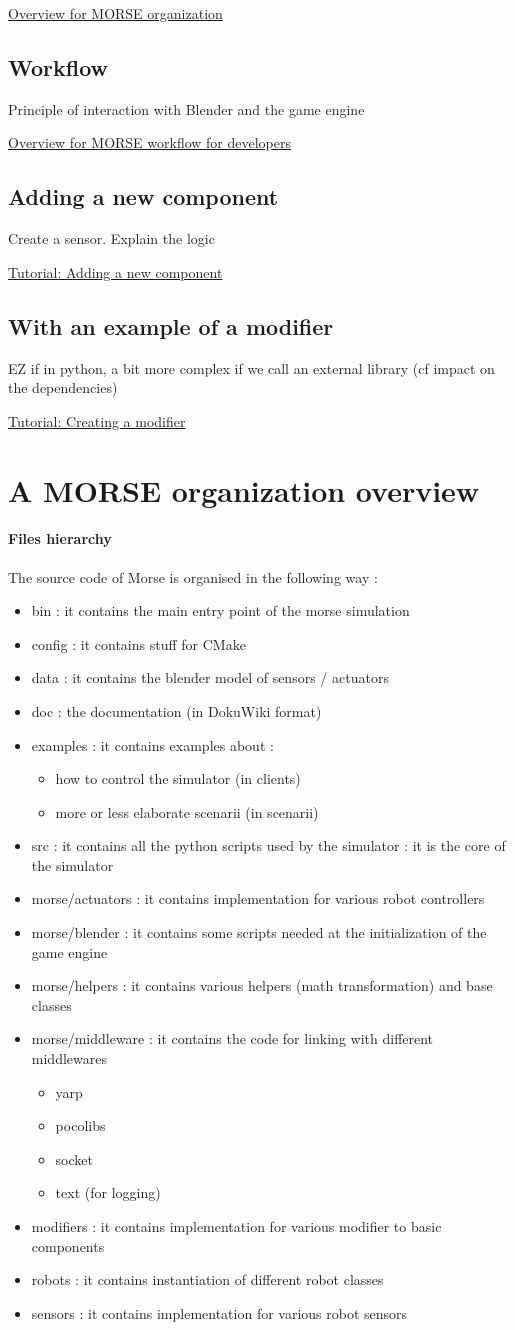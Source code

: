 \documentclass[twoside,a4paper,10pt]{report}
\newcommand{\dokutitlelevelone}[1]{\chapter{#1}}
\newcommand{\dokutitleleveltwo}[1]{\section{#1}}
\newcommand{\dokutitlelevelfour}[1]{\subsubsection{#1}}
\newcommand{\dokuitem}{\item}
\begin{document}
\hyperref[1f96d32f5afc29e1f5142ae3365d880b]{ Overview for MORSE organization}


\dokutitleleveltwo{Workflow}
\label{2e2e2d35a15a6146a9bbbc246a9ea4cd}%
Principle of interaction with Blender and the game engine

\hyperref[8e26c06a643302a6445b3bace01e145d]{ Overview for MORSE workflow for developers}


\dokutitleleveltwo{Adding a new component}
\label{d6803cd830a74126c504056aa5dc3942}%
Create a sensor. Explain the logic

\hyperref[a75d8217092912ac621cdbf4c37d0162]{ Tutorial: Adding a new component}


\dokutitleleveltwo{With an example of a modifier}
\label{c40195b9cfea7b29114ccb28ad6dc60e}%

EZ if in python, a bit more complex if we call an external library (cf impact on the dependencies) 

\hyperref[ddaae98df566ec14d90bd06e83e3787f]{ Tutorial: Creating a modifier}

\dokutitlelevelone{A MORSE organization overview}
\label{3317db1fdc670ed991ca495fec5177d0}%
\label{1f96d32f5afc29e1f5142ae3365d880b}%

\dokutitlelevelfour{Files hierarchy}

The source code of Morse is organised in the following way :


\begin{itemize}
\dokuitem  bin : it contains the main entry point of the morse simulation
\dokuitem  config : it contains stuff for CMake 
\dokuitem  data : it contains the blender model of sensors / actuators
\dokuitem  doc : the documentation (in DokuWiki format)
\dokuitem  examples : it contains examples about :
\begin{itemize}
\dokuitem  how to control the simulator (in clients)
\dokuitem  more or less elaborate scenarii (in scenarii)
\end{itemize}

\dokuitem  src : it contains all the python scripts used by the simulator : it is the core of the simulator
\dokuitem  morse/actuators : it contains implementation for various robot controllers
\dokuitem  morse/blender : it contains some scripts needed at the initialization of the game engine
\dokuitem  morse/helpers : it contains various helpers (math transformation) and base classes
\dokuitem  morse/middleware : it contains the code for linking with different middlewares 
\begin{itemize}
\dokuitem  yarp
\dokuitem  pocolibs 
\dokuitem  socket
\dokuitem  text (for logging)
\end{itemize}

\dokuitem  modifiers : it contains implementation for various modifier to basic components
\dokuitem  robots : it contains instantiation of different robot classes
\dokuitem  sensors : it contains implementation for various robot sensors
\end{itemize}
\end{document}

